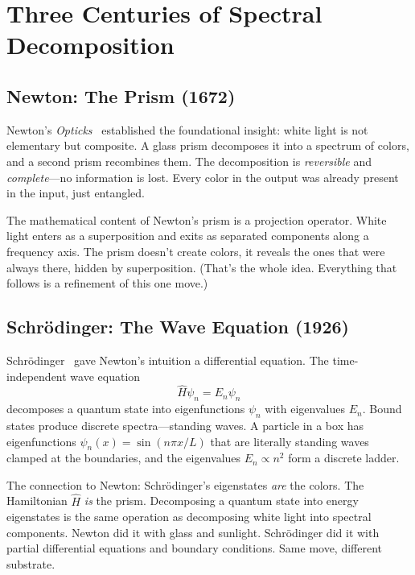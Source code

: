 \documentclass[12pt,oneside]{article}
\theoremstyle{principia}
\theoremstyle{definition}
\theoremstyle{remark}
\begin{document}
\section{Three Centuries of Spectral Decomposition}


\subsection{Newton: The Prism (1672)}

Newton's \emph{Opticks}~\cite{newton} established the foundational insight: white light is not elementary but composite. A glass prism decomposes it into a spectrum of colors, and a second prism recombines them. The decomposition is \emph{reversible} and \emph{complete}---no information is lost. Every color in the output was already present in the input, just entangled.

The mathematical content of Newton's prism is a projection operator. White light enters as a superposition and exits as separated components along a frequency axis. The prism doesn't create colors, it reveals the ones that were always there, hidden by superposition. (That's the whole idea. Everything that follows is a refinement of this one move.)

\subsection{Schr\"odinger: The Wave Equation (1926)}

Schr\"odinger~\cite{schrodinger} gave Newton's intuition a differential equation. The time-independent wave equation
\begin{equation}\label{eq:schrodinger}
\hat{H}\psi_n = E_n \psi_n
\end{equation}
decomposes a quantum state into eigenfunctions $\psi_n$ with eigenvalues $E_n$. Bound states produce discrete spectra---standing waves. A particle in a box has eigenfunctions $\psi_n(x) = \sin(n\pi x / L)$ that are literally standing waves clamped at the boundaries, and the eigenvalues $E_n \propto n^2$ form a discrete ladder.

The connection to Newton: Schr\"odinger's eigenstates \emph{are} the colors. The Hamiltonian $\hat{H}$ \emph{is} the prism. Decomposing a quantum state into energy eigenstates is the same operation as decomposing white light into spectral components. Newton did it with glass and sunlight. Schr\"odinger did it with partial differential equations and boundary conditions. Same move, different substrate.
\end{document}
